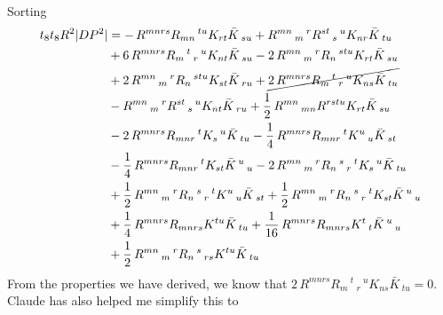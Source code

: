 Sorting
\begin{equation}
\begin{aligned}
t_8 t_8 R^2 |DP^2|
&=-\,R^{m n r s} R_{m n}\,^{t u} K_{r t} \bar{K}\,_{s u}
+R^{m n}\,_{m}\,^{r} R^{s t}\,_{s}\,^{u} K_{n r} \bar{K}\,_{t u}\\
&+6\,R^{m n r s} R_{m}\,^{t}\,_{r}\,^{u} K_{n t} \bar{K}\,_{s u}
-2\,R^{m n}\,_{m}\,^{r} R_{n}\,^{s t u} K_{r t} \bar{K}\,_{s u}\\
&+2\,R^{m n}\,_{m}\,^{r} R_{n}\,^{s t u} K_{s t} \bar{K}\,_{r u}
+\cancel{2\,R^{m n r s} R_{m}\,^{t}\,_{r}\,^{u} K_{n s} \bar{K}\,_{t u}}\\
&-R^{m n}\,_{m}\,^{r} R^{s t}\,_{s}\,^{u} K_{n t} \bar{K}\,_{r u}
+\frac{1}{2}\,R^{m n}\,_{m n} R^{r s t u} K_{r t} \bar{K}\,_{s u}\\
&-2\,R^{m n r s} R_{m n r}\,^{t} K_{s}\,^{u} \bar{K}\,_{t u}
-\frac{1}{4}\,R^{m n r s} R_{m n r}\,^{t} K^{u}\,_{u} \bar{K}\,_{s t}\\
&-\frac{1}{4}\,R^{m n r s} R_{m n r}\,^{t} K_{s t} \bar{K}\,^{u}\,_{u}
-2\,R^{m n}\,_{m}\,^{r} R_{n}\,^{s}\,_{r}\,^{t} K_{s}\,^{u} \bar{K}\,_{t u}\\
&+\frac{1}{2}\,R^{m n}\,_{m}\,^{r} R_{n}\,^{s}\,_{r}\,^{t} K^{u}\,_{u} \bar{K}\,_{s t}
+\frac{1}{2}\,R^{m n}\,_{m}\,^{r} R_{n}\,^{s}\,_{r}\,^{t} K_{s t} \bar{K}\,^{u}\,_{u}\\
&+\frac{1}{4}\,R^{m n r s} R_{m n r s} K^{t u} \bar{K}\,_{t u}
+\frac{1}{16}\,R^{m n r s} R_{m n r s} K^{t}\,_{t} \bar{K}\,^{u}\,_{u}\\
&+\frac{1}{2}\,R^{m n}\,_{m}\,^{r} R_{n}\,^{s}\,_{r s} K^{t u} \bar{K}\,_{t u}
\end{aligned}
\end{equation}
From the properties we have derived, we know that $2\,R^{m n r s} R_{m}\,^{t}\,_{r}\,^{u} K_{n s} \bar{K}\,_{t u} = 0$.
Claude has also helped me simplify this to

